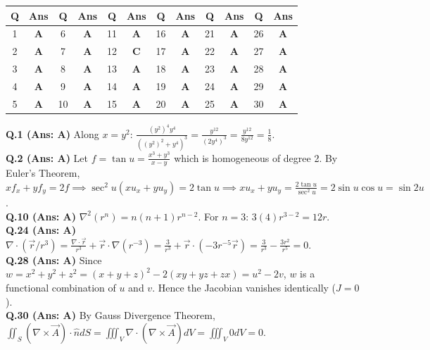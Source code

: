 \begin{center}
\begin{tabular}{|c|c||c|c||c|c||c|c||c|c||c|c|}
\hline
\textbf{Q} & \textbf{Ans} & \textbf{Q} & \textbf{Ans} & \textbf{Q} & \textbf{Ans} & \textbf{Q} & \textbf{Ans} & \textbf{Q} & \textbf{Ans} & \textbf{Q} & \textbf{Ans} \\
\hline
1 & \textbf{A} & 6 & \textbf{A} & 11 & \textbf{A} & 16 & \textbf{A} & 21 & \textbf{A} & 26 & \textbf{A} \\
2 & \textbf{A} & 7 & \textbf{A} & 12 & \textbf{C} & 17 & \textbf{A} & 22 & \textbf{A} & 27 & \textbf{A} \\
3 & \textbf{A} & 8 & \textbf{A} & 13 & \textbf{A} & 18 & \textbf{A} & 23 & \textbf{A} & 28 & \textbf{A} \\
4 & \textbf{A} & 9 & \textbf{A} & 14 & \textbf{A} & 19 & \textbf{A} & 24 & \textbf{A} & 29 & \textbf{A} \\
5 & \textbf{A} & 10 & \textbf{A} & 15 & \textbf{A} & 20 & \textbf{A} & 25 & \textbf{A} & 30 & \textbf{A} \\
\hline
\end{tabular}
\end{center}

\begin{solutionbox}
\textbf{Q.1 (Ans: A)} Along $x = y^2$: $\frac{(y^2)^4 y^4}{((y^2)^2 + y^4)^3} = \frac{y^{12}}{(2y^4)^3} = \frac{y^{12}}{8y^{12}} = \frac{1}{8}$.\\[1.5mm]
\textbf{Q.2 (Ans: A)} Let $f = \tan u = \frac{x^3+y^3}{x-y}$ which is homogeneous of degree 2. By Euler's Theorem, $x f_x + y f_y = 2f \implies \sec^2 u (x u_x + y u_y) = 2\tan u \implies x u_x + y u_y = \frac{2\tan u}{\sec^2 u} = 2\sin u\cos u = \sin 2u$.\\[1.5mm]
\textbf{Q.10 (Ans: A)} $\nabla^2(r^n) = n(n+1)r^{n-2}$. For $n=3$: $3(4)r^{3-2} = 12r$.\\[1.5mm]
\textbf{Q.24 (Ans: A)} $\nabla \cdot (\vec{r}/r^3) = \frac{\nabla \cdot \vec{r}}{r^3} + \vec{r} \cdot \nabla(r^{-3}) = \frac{3}{r^3} + \vec{r} \cdot (-3r^{-5}\vec{r}) = \frac{3}{r^3} - \frac{3r^2}{r^5} = 0$.\\[1.5mm]
\textbf{Q.28 (Ans: A)} Since $w = x^2+y^2+z^2 = (x+y+z)^2 - 2(xy+yz+zx) = u^2 - 2v$, $w$ is a functional combination of $u$ and $v$. Hence the Jacobian vanishes identically ($J = 0$).\\[1.5mm]
\textbf{Q.30 (Ans: A)} By Gauss Divergence Theorem, $\iint_S (\nabla \times \vec{A}) \cdot \hat{n} dS = \iiint_V \nabla \cdot (\nabla \times \vec{A}) dV = \iiint_V 0 dV = 0$.
\end{solutionbox}

